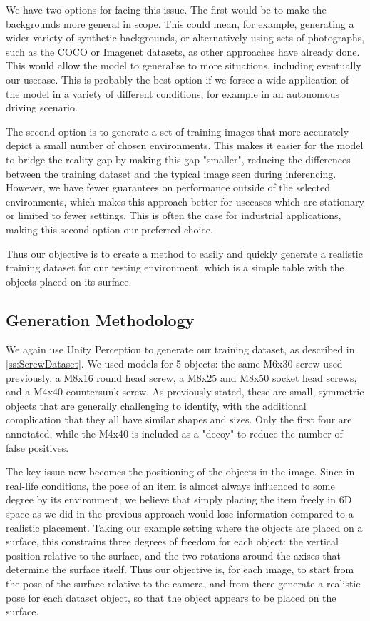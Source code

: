 We have two options for facing this issue. The first would be to make the backgrounds more general in scope. This could mean, for example, generating a wider variety of synthetic backgrounds, or alternatively using sets of photographs, such as the COCO or Imagenet datasets, as other approaches have already done\cite{DPOD}. This would allow the model to generalise to more situations, including eventually our usecase. This is probably the best option if we forsee a wide application of the model in a variety of different conditions, for example in an autonomous driving scenario.

The second option is to generate a set of training images that more accurately depict a small number of chosen environments. This makes it easier for the model to bridge the reality gap by making this gap "smaller", reducing the differences between the training dataset and the typical image seen during inferencing. However, we have fewer guarantees on performance outside of the selected environments, which makes this approach better for usecases which are stationary or limited to fewer settings. This is often the case for industrial applications, making this second option our preferred choice.

Thus our objective is to create a method to easily and quickly generate a realistic training dataset for our testing environment, which is a simple table with the objects placed on its surface.

\subsection{Generation Methodology}

We again use Unity Perception to generate our training dataset, as described in \ref{ss:ScrewDataset}. We used models for 5 objects: the same M6x30 screw used previously, a M8x16 round head screw, a M8x25 and M8x50 socket head screws, and a M4x40 countersunk screw. As previously stated, these are small, symmetric objects that are generally challenging to identify, with the additional complication that they all have similar shapes and sizes. Only the first four  are annotated, while the M4x40 is included as a "decoy" to reduce the number of false positives.

The key issue now becomes the positioning of the objects in the image. Since in real-life conditions, the pose of an item is almost always influenced to some degree by its environment, we believe that simply placing the item freely in 6D space as we did in the previous approach would lose information compared to a realistic placement. Taking our example setting where the objects are placed on a surface, this constrains three degrees of freedom for each object: the vertical position relative to the surface, and the two rotations around the axises that determine the surface itself. Thus our objective is, for each image, to start from the pose of the surface relative to the camera, and from there generate a realistic pose for each dataset object, so that the object appears to be placed on the surface.


